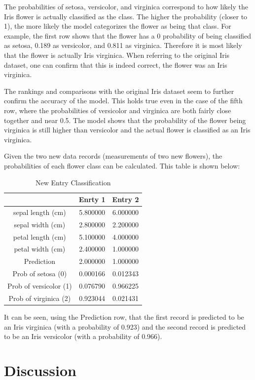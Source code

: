 \documentclass[journal]{IEEEtran}
\begin{document}
The probabilities of setosa, versicolor, and virginica correspond to how likely the Iris flower is actually classified as the class. The higher the probability (closer to 1), the more likely the model categorizes the flower as being that class. For example, the first row shows that the flower has a 0 probability of being classified as setosa, 0.189 as versicolor, and 0.811 as virginica. Therefore it is most likely that the flower is actually Iris virginica. When referring to the original Iris dataset, one can confirm that this is indeed correct, the flower was an Iris virginica. 

The rankings and comparisons with the original Iris dataset seem to further confirm the accuracy of the model. This holds true even in the case of the fifth row, where the probabilities of versicolor and virginica are both fairly close together and near 0.5. The model shows that the probability of the flower being virginica is still higher than versicolor and the actual flower is classified as an Iris virginica. 

Given the two new data records (measurements of two new flowers), the probabilities of each flower class can be calculated. This table is shown below: 
    
\begin{table}[h!]
\centering
\begin{tabular}{ c | c c }
 & Enrty 1 &	Entry 2 \\ 
\hline
sepal length (cm)	& 5.800000	& 6.000000 \\
sepal width (cm)	& 2.800000	& 2.200000 \\
petal length (cm)	& 5.100000	& 4.000000 \\
petal width (cm)	& 2.400000	& 1.000000 \\
Prediction	& 2.000000	& 1.000000 \\
Prob of setosa (0)	& 0.000166	& 0.012343 \\
Prob of versicolor (1)	& 0.076790	& 0.966225 \\
Prob of virginica (2)	& 0.923044	& 0.021431
\end{tabular}
\caption{New Entry Classification}
\label{table:new-entry-table}
\end{table}

It can be seen, using the Prediction row, that the first record is predicted to be an Iris virginica (with a probability of 0.923) and the second record is predicted to be an Iris versicolor (with a probability of 0.966).

\section{Discussion}
\end{document}
